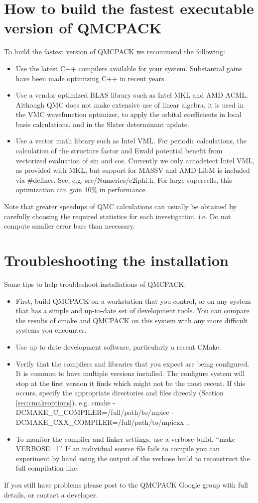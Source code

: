 \section{How to build the fastest executable version of QMCPACK}
\label{sec:buildperformance}
To build the fastest version of QMCPACK we recommend the following:
\begin{itemize}
\item Use the latest C++ compilers available for your
  system. Substantial gains have been made optimizing C++ in recent
  years.
\item Use a vendor optimized BLAS library such as Intel MKL and AMD ACML. Although
  QMC does not make extensive use of linear algebra, it is used in the
  VMC wavefunction optimizer, to apply the orbital coefficients in local basis
  calculations, and in the Slater determinant update.
\item Use a vector math library such as Intel VML.  For periodic
  calculations, the calculation of the structure factor and Ewald
  potential benefit from vectorized evaluation of sin and
  cos. Currently we only autodetect Intel VML, as provided with MKL,
  but support for MASSV and AMD LibM is included via \#defines. See,
  e.g. src/Numerics/e2iphi.h. For
  large supercells, this optimization can gain 10\% in performance.
\end{itemize}

Note that greater speedups of QMC calculations can usually be obtained by
carefully choosing the required statistics for each
investigation. i.e. Do not compute smaller error bars than necessary.

\section{Troubleshooting the installation}
\label{sec:troubleshoot}
Some tips to help troubleshoot installations of QMCPACK:
\begin{itemize}
\item First, build QMCPACK on a workstation that you control, or on any
  system that has a simple and up-to-date set of development
  tools. You can compare the results of cmake and QMCPACK on this
  system with any more difficult systems you encounter.
\item Use up to date development software, particularly a recent
  CMake. 
\item Verify that the compilers and libraries that you expect are
  being configured. It is common to have multiple versions
  installed. The configure system will stop at the first version it
  finds which might not be the most recent. If this occurs, specify the appropriate
  directories and files directly (Section
  \ref{sec:cmakeoptions}). e.g. cmake -DCMAKE\_C\_COMPILER=/full/path/to/mpicc -DCMAKE\_CXX\_COMPILER=/full/path/to/mpicxx ..
\item To monitor the compiler and linker settings, use a verbose build, ``make
  VERBOSE=1''. If an individual source file fails to compile you
  can experiment by hand using the output of the verbose build to
  reconstruct the full compilation line.
\end{itemize}

If you still have problems please post to the QMCPACK Google group with full
details, or contact a developer.
